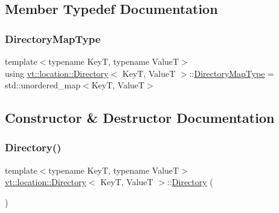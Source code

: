 \subsection{Member Typedef Documentation}
\mbox{\label{structvt_1_1location_1_1_directory_a6a897ff3929eccb2d334eb0b87b53f57}} 
\subsubsection{\texorpdfstring{Directory\+Map\+Type}{DirectoryMapType}}
{\footnotesize\ttfamily template$<$typename KeyT, typename ValueT$>$ \\
using \hyperlink{structvt_1_1location_1_1_directory}{vt\+::location\+::\+Directory}$<$ KeyT, ValueT $>$\+::\hyperlink{structvt_1_1location_1_1_directory_a6a897ff3929eccb2d334eb0b87b53f57}{Directory\+Map\+Type} =  std\+::unordered\+\_\+map$<$KeyT, ValueT$>$}



\subsection{Constructor \& Destructor Documentation}
\mbox{\label{structvt_1_1location_1_1_directory_a166cb46d3274d1bc09e4b852d70172af}} 
\subsubsection{\texorpdfstring{Directory()}{Directory()}}
{\footnotesize\ttfamily template$<$typename KeyT, typename ValueT$>$ \\
\hyperlink{structvt_1_1location_1_1_directory}{vt\+::location\+::\+Directory}$<$ KeyT, ValueT $>$\+::\hyperlink{structvt_1_1location_1_1_directory}{Directory} (\begin{DoxyParamCaption}{ }\end{DoxyParamCaption})\hspace{0.3cm}{\ttfamily [default]}}



